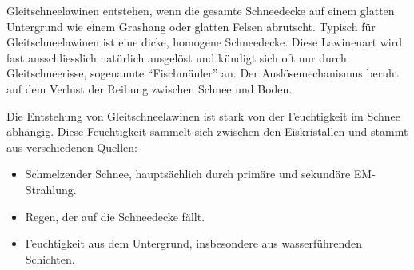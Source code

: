 


Gleitschneelawinen entstehen, wenn die gesamte Schneedecke auf einem glatten Untergrund wie einem Grashang oder glatten Felsen abrutscht. Typisch für Gleitschneelawinen ist eine dicke, homogene Schneedecke. Diese Lawinenart wird fast ausschliesslich natürlich ausgelöst und kündigt sich oft nur durch Gleitschneerisse, sogenannte “Fischmäuler” an. Der Auslösemechanismus beruht auf dem Verlust der Reibung zwischen Schnee und Boden. \cite{Mitterer.202}

Die Entstehung von Gleitschneelawinen ist stark von der Feuchtigkeit im Schnee abhängig. Diese Feuchtigkeit sammelt sich zwischen den Eiskristallen und stammt aus verschiedenen Quellen:

\begin{itemize}
    \item Schmelzender Schnee, hauptsächlich durch primäre und sekundäre EM-Strahlung.
    \item Regen, der auf die Schneedecke fällt.
    \item Feuchtigkeit aus dem Untergrund, insbesondere aus wasserführenden Schichten.

\end{itemize}
